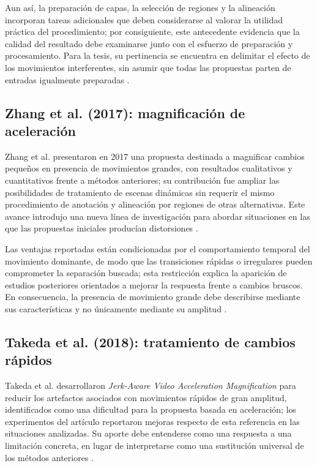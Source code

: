 Aun así, la preparación de capas, la selección de regiones y la alineación incorporan tareas adicionales que deben considerarse al valorar la utilidad práctica del procedimiento; por consiguiente, este antecedente evidencia que la calidad del resultado debe examinarse junto con el esfuerzo de preparación y procesamiento. Para la tesis, su pertinencia se encuentra en delimitar el efecto de los movimientos interferentes, sin asumir que todas las propuestas parten de entradas igualmente preparadas \cite{elgharib2015video}.

\subsection{Zhang et al. (2017): magnificación de aceleración}

Zhang et al. presentaron en 2017 una propuesta destinada a magnificar cambios pequeños en presencia de movimientos grandes, con resultados cualitativos y cuantitativos frente a métodos anteriores; su contribución fue ampliar las posibilidades de tratamiento de escenas dinámicas sin requerir el mismo procedimiento de anotación y alineación por regiones de otras alternativas. Este avance introdujo una nueva línea de investigación para abordar situaciones en las que las propuestas iniciales producían distorsiones \cite{zhang2017acceleration}.

Las ventajas reportadas están condicionadas por el comportamiento temporal del movimiento dominante, de modo que las transiciones rápidas o irregulares pueden comprometer la separación buscada; esta restricción explica la aparición de estudios posteriores orientados a mejorar la respuesta frente a cambios bruscos. En consecuencia, la presencia de movimiento grande debe describirse mediante sus características y no únicamente mediante su amplitud \cite{zhang2017acceleration,takeda2018jerk}.

\subsection{Takeda et al. (2018): tratamiento de cambios rápidos}

Takeda et al. desarrollaron \textit{Jerk-Aware Video Acceleration Magnification} para reducir los artefactos asociados con movimientos rápidos de gran amplitud, identificados como una dificultad para la propuesta basada en aceleración; los experimentos del artículo reportaron mejoras respecto de esta referencia en las situaciones analizadas. Su aporte debe entenderse como una respuesta a una limitación concreta, en lugar de interpretarse como una sustitución universal de los métodos anteriores \cite{takeda2018jerk}.

